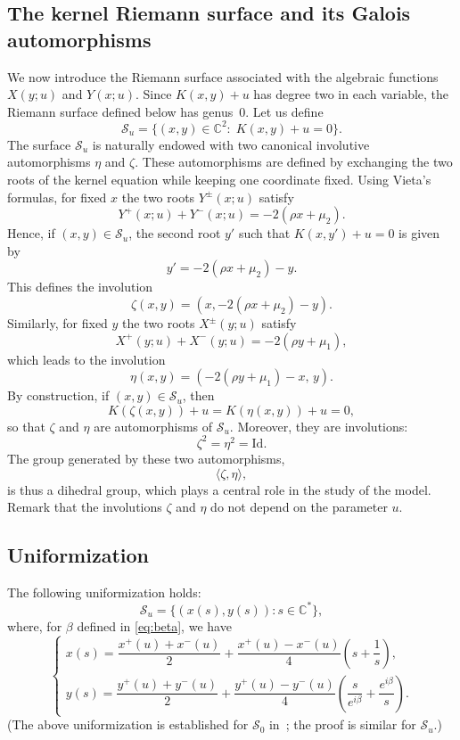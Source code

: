 \documentclass[11pt]{article}
\theoremstyle{definition}
\begin{document}
\subsection{The kernel Riemann surface and its Galois automorphisms}

We now introduce the Riemann surface associated with the algebraic functions
$X(y;u)$ and $Y(x;u)$. Since $K(x,y)+u$ has degree two in each variable, the Riemann surface defined below %
has genus~$0$. Let us define
\[
\mathcal{S}_u=\{(x,y)\in\mathbb{C}^2:\;K(x,y)+u=0\}.
\]
The surface $\mathcal{S}_u$ is naturally endowed with two canonical involutive automorphisms $\eta$ and $\zeta$. 
These automorphisms are defined by exchanging the two roots of the kernel equation while keeping one coordinate fixed.
Using Vieta's formulas, for fixed $x$ the two roots $Y^\pm(x;u)$ satisfy
\[
Y^+(x;u)+Y^-(x;u)=-2(\rho x+\mu_2).
\]
Hence, if $(x,y)\in\mathcal{S}_u$, the second root $y'$ such that $K(x,y')+u=0$ is given by
\[
y'=-2(\rho x+\mu_2)-y.
\]
This defines the involution
\[
\zeta(x,y)
=\left(x,-2(\rho x+\mu_2)-y\right).
\]
Similarly, for fixed $y$ the two roots $X^\pm(y;u)$ satisfy
\[
X^+(y;u)+X^-(y;u)=-2(\rho y+\mu_1),
\]
which leads to the involution
\[
\eta(x,y)=\left(-2(\rho y+\mu_1)-x,\,y\right).
\]
By construction, if $(x,y)\in\mathcal{S}_u$, then
\[
K(\zeta(x,y))+u=K(\eta(x,y))+u=0,
\]
so that $\zeta$ and $\eta$ are automorphisms of $\mathcal{S}_u$.
Moreover, they are involutions:
\[
\zeta^2=\eta^2=\mathrm{Id}.
\]
The group generated by these two automorphisms,
\[
\langle \zeta,\eta \rangle,
\]
is thus a dihedral group, which plays a central role in the study of the model.
Remark that the involutions $\zeta$ and $\eta$ do not depend on the parameter $u$. 

\subsection{Uniformization}

The following uniformization holds:
\begin{equation}
\mathcal{S}_u=\{(x(s), y(s)): s \in \mathbb{C}^* \},
\label{eq:SC*}
\end{equation}
where, for $\beta$ defined in \eqref{eq:beta}, we have
$$
\left\{\begin{array}{l}
x(s)=\dfrac{x^{+}(u)+x^{-}(u)}{2}+\dfrac{x^{+}(u)-x^{-}(u)}{4}\left(s+\dfrac{1}{s}\right), \\[1.2ex]
y(s)=\dfrac{y^{+}(u)+y^{-}(u)}{2}+\dfrac{y^{+}(u)-y^{-}(u)}{4}\left(\dfrac{s}{e^{i \beta}}+\dfrac{e^{i \beta}}{s}\right).
\end{array}\right .
$$
(The above uniformization is established for $\mathcal{S}_0$ in~\cite{franceschi_kourkova_asymptotic_2017}; the proof is similar for $\mathcal{S}_u$.)
\end{document}
